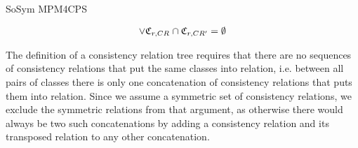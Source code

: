 \begin{copiedFrom}{SoSym MPM4CPS}
\begin{definition}
\begin{align*}
        \lor \mathfrak{C}_{r,CR_{}} \cap
        \mathfrak{C}_{r,CR'_{}} = \emptyset
    \end{align*}
\end{definition}

The definition of a consistency relation tree requires that there are no sequences of consistency relations that put the same classes into relation, i.e. between all pairs of classes there is only one concatenation of consistency relations that puts them into relation.
Since we assume a symmetric set of consistency relations, we exclude the symmetric relations from that argument, as otherwise there would always be two such concatenations by adding a consistency relation and its transposed relation to any other concatenation.


\end{copiedFrom}
